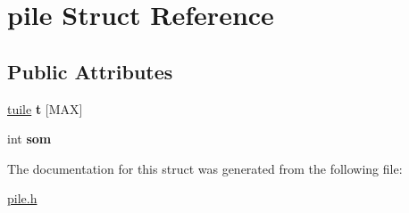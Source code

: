 \hypertarget{structpile}{}\section{pile Struct Reference}
\label{structpile}
\subsection*{Public Attributes}
\begin{DoxyCompactItemize}
\item 
\hyperlink{structtuile__s}{tuile} {\bfseries t} \mbox{[}M\+AX\mbox{]}\hypertarget{structpile_af3c370aeed7f3a03a14c80fb8cfe548a}{}\label{structpile_af3c370aeed7f3a03a14c80fb8cfe548a}

\item 
int {\bfseries som}\hypertarget{structpile_a381a1e1cf88be00adb3c5805edda88b4}{}\label{structpile_a381a1e1cf88be00adb3c5805edda88b4}

\end{DoxyCompactItemize}


The documentation for this struct was generated from the following file\+:\begin{DoxyCompactItemize}
\item 
\hyperlink{pile_8h}{pile.\+h}\end{DoxyCompactItemize}

